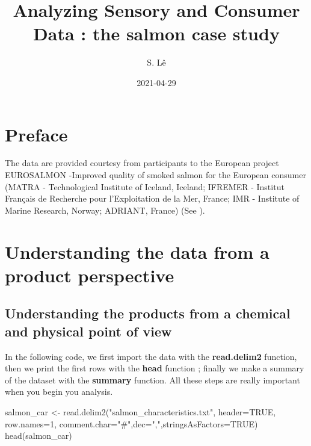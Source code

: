 \documentclass[
]{book}
\title{Analyzing Sensory and Consumer Data : the salmon case study}
\author{S. Lê}
\date{2021-04-29}
\newenvironment{Shaded}{\begin{snugshade}}{\end{snugshade}}
\newcommand{\AttributeTok}[1]{\textcolor[rgb]{0.77,0.63,0.00}{#1}}
\newcommand{\ConstantTok}[1]{\textcolor[rgb]{0.00,0.00,0.00}{#1}}
\newcommand{\DecValTok}[1]{\textcolor[rgb]{0.00,0.00,0.81}{#1}}
\newcommand{\FunctionTok}[1]{\textcolor[rgb]{0.00,0.00,0.00}{#1}}
\newcommand{\NormalTok}[1]{#1}
\newcommand{\OtherTok}[1]{\textcolor[rgb]{0.56,0.35,0.01}{#1}}
\newcommand{\StringTok}[1]{\textcolor[rgb]{0.31,0.60,0.02}{#1}}
\begin{document}
\maketitle

{
\setcounter{tocdepth}{1}
\tableofcontents
}
\hypertarget{preface}{%
\chapter*{Preface}\label{preface}}

The data are provided courtesy from participants to the European project EUROSALMON -Improved quality of smoked salmon for the European consumer (MATRA - Technological Institute of Iceland, Iceland; IFREMER - Institut Français de Recherche pour l'Exploitation de la Mer, France; IMR - Institute of Marine Research, Norway; ADRIANT, France) (See \citet{courcoux06}).

\hypertarget{understanding-the-data-from-a-product-perspective}{%
\chapter{Understanding the data from a product perspective}\label{understanding-the-data-from-a-product-perspective}}

\hypertarget{understanding-the-products-from-a-chemical-and-physical-point-of-view}{%
\section{Understanding the products from a chemical and physical point of view}\label{understanding-the-products-from-a-chemical-and-physical-point-of-view}}

In the following code, we first import the data with the \textbf{read.delim2} function, then we print the first rows with the \textbf{head} function ; finally we make a summary of the dataset with the \textbf{summary} function. All these steps are really important when you begin you analysis.

\begin{Shaded}
\begin{Highlighting}[]
\NormalTok{salmon\_car }\OtherTok{\textless{}{-}} \FunctionTok{read.delim2}\NormalTok{(}\StringTok{"salmon\_characteristics.txt"}\NormalTok{, }
\AttributeTok{header=}\ConstantTok{TRUE}\NormalTok{, }\AttributeTok{row.names=}\DecValTok{1}\NormalTok{, }\AttributeTok{comment.char=}\StringTok{"\#"}\NormalTok{,}\AttributeTok{dec=}\StringTok{","}\NormalTok{,}\AttributeTok{stringsAsFactors=}\ConstantTok{TRUE}\NormalTok{)}
\FunctionTok{head}\NormalTok{(salmon\_car)}
\end{Highlighting}
\end{Shaded}
\end{document}
